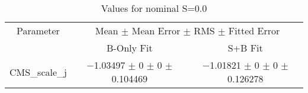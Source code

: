 \begin{table}
\centering
\caption{Values for nominal S=0.0}
\begin{tabular}{ccc}
\toprule
Parameter & \multicolumn{2}{c}{Mean $\pm$ Mean Error $\pm$ RMS $\pm$ Fitted Error}\\
 & B-Only Fit & S+B Fit\\
\midrule
CMS\_scale\_j & \num{-1.03497} $\pm$ \num{0} $\pm$ \num{0} $\pm$ \num{0.104469} & \num{-1.01821} $\pm$ \num{0} $\pm$ \num{0} $\pm$ \num{0.126278}\\
\bottomrule
\end{tabular}
\end{table}